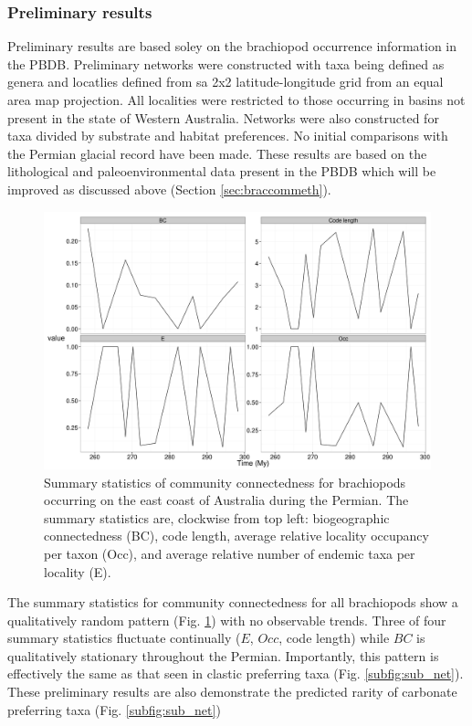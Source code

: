 \documentclass[12pt,letterpaper]{article}
\begin{document}
\subsubsection{Preliminary results} \label{sec:braccomres}
Preliminary results are based soley on the brachiopod occurrence information in the PBDB. Preliminary networks were constructed with taxa being defined as genera and locatlies defined from sa 2x2 latitude-longitude grid from an equal area map projection. All localities were restricted to those occurring in basins not present in the state of Western Australia. Networks were also constructed for taxa divided by substrate and habitat preferences. No initial comparisons with the Permian glacial record have been made. These results are based on the lithological and paleoenvironmental data present in the PBDB which will be improved as discussed above (Section \ref{sec:braccommeth}).

\begin{figure}[ht]
  \begin{center}
    \includegraphics[width = \textwidth, keepaspectratio = true]{figure/east_cast}
  \end{center}
  \caption[Community connectedness statistics for Australaian brachiopods]{Summary statistics of community connectedness for brachiopods occurring on the east coast of Australia during the Permian. The summary statistics are, clockwise from top left: biogeographic connectedness (BC), code length, average relative locality occupancy per taxon (Occ), and average relative number of endemic taxa per locality (E).} 
  \label{fig:brac_net}
\end{figure}

The summary statistics for community connectedness for all brachiopods show a qualitatively random pattern (Fig. \ref{fig:brac_net}) with no observable trends. Three of four summary statistics fluctuate continually (\(E\), \(Occ\), code length) while \(BC\) is qualitatively stationary throughout the Permian. Importantly, this pattern is effectively the same as that seen in clastic preferring taxa (Fig. \ref{subfig:sub_net}). These preliminary results are also demonstrate the predicted rarity of carbonate preferring taxa (Fig. \ref{subfig:sub_net})
\end{document}
